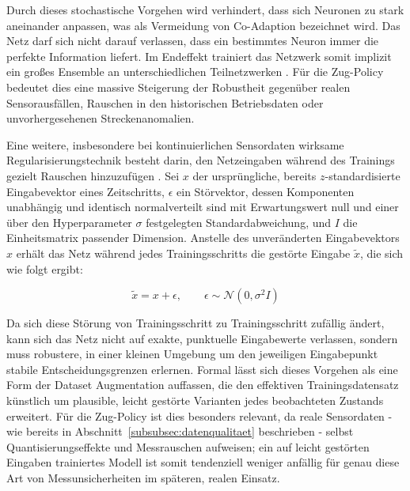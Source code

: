 Durch dieses stochastische Vorgehen wird verhindert, dass sich Neuronen zu stark aneinander anpassen, was als Vermeidung von Co-Adaption bezeichnet wird. 
Das Netz darf sich nicht darauf verlassen, dass ein bestimmtes Neuron immer die perfekte Information liefert. 
Im Endeffekt trainiert das Netzwerk somit implizit ein großes Ensemble an unterschiedlichen Teilnetzwerken \cite[vgl.~S.~258~\&~S.~266]{chap2_Goo16}. 
Für die Zug-Policy bedeutet dies eine massive Steigerung der Robustheit gegenüber realen Sensorausfällen, Rauschen in den historischen Betriebsdaten oder unvorhergesehenen Streckenanomalien.

Eine weitere, insbesondere bei kontinuierlichen Sensordaten wirksame Regularisierungstechnik besteht darin, den Netzeingaben während des Trainings gezielt Rauschen hinzuzufügen \cite[vgl.][S.~238ff.]{chap2_Goo16}. 
Sei $x$ der ursprüngliche, bereits $z$-standardisierte Eingabevektor eines Zeitschritts, $\epsilon$ ein Störvektor, dessen Komponenten unabhängig und identisch normalverteilt sind mit Erwartungswert null und einer über den Hyperparameter $\sigma$ festgelegten Standardabweichung, und $I$ die Einheitsmatrix passender Dimension. Anstelle des unveränderten Eingabevektors $x$ erhält das Netz während jedes Trainingsschritts die gestörte Eingabe $\tilde{x}$, die sich wie folgt ergibt:

\begin{equation} \label{eq:noise}
\tilde{x} = x + \epsilon, \qquad \epsilon \sim \mathcal{N}(0, \sigma^2 I)
\end{equation}

Da sich diese Störung von Trainingsschritt zu Trainingsschritt zufällig ändert, kann sich das Netz nicht auf exakte, punktuelle Eingabewerte verlassen, sondern muss robustere, in einer kleinen Umgebung um den jeweiligen Eingabepunkt stabile Entscheidungsgrenzen erlernen. Formal lässt sich dieses Vorgehen als eine Form der Dataset Augmentation auffassen, die den effektiven Trainingsdatensatz künstlich um plausible, leicht gestörte Varianten jedes beobachteten Zustands erweitert. Für die Zug-Policy ist dies besonders relevant, da reale Sensordaten - wie bereits in Abschnitt~\ref{subsubsec:datenqualitaet} beschrieben - selbst Quantisierungseffekte und Messrauschen aufweisen; ein auf leicht gestörten Eingaben trainiertes Modell ist somit tendenziell weniger anfällig für genau diese Art von Messunsicherheiten im späteren, realen Einsatz.
